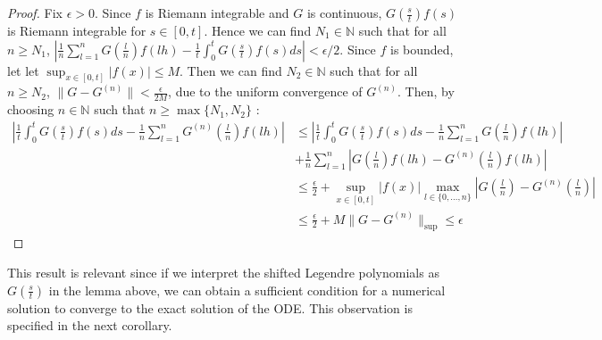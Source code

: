 \documentclass{article}
\theoremstyle{definition}
\newcommand{\pr}[1]{ \left( #1 \right) }
\begin{document}
\begin{proof}
    Fix $\epsilon > 0$. Since $f$ is Riemann integrable and $G$ is continuous, $G\pr{\frac{s}{t}}f(s)$ is Riemann integrable for $s \in [0,t]$. Hence we can find $N_1 \in \mathbb{N}$ such that for all $n \geq N_1$, $\left| \frac{1}{n} \sum_{l=1}^n G \pr{\frac{l}{n}}f\pr{lh} - \frac{1}{t}\int_0^t G \pr{\frac{s}{t}}f\pr{s} ds \right| < \epsilon / 2$. Since $f$ is bounded, let let $\sup_{x \in [0,t]} |f(x)| \leq M$. Then we can find $N_2 \in \mathbb{N}$ such that for all $n \geq N_2$, $\|G - G^{(n)}\| < \frac{\epsilon}{2M}$, due to the uniform convergence of $G^{(n)}$. Then, by choosing $n \in \mathbb{N}$ such that $n \geq \max\{N_1,N_2\}$ :
    \begin{align*}
        \left| \frac{1}{t}\int_0^t G \pr{\frac{s}{t} }f(s)ds - \frac{1}{n}\sum_{l=1}^n G^{(n)} \pr{\frac{l}{n}} f \pr{lh} \right| 
        &\leq \left| \frac{1}{t}\int_0^t G \pr{\frac{s}{t}} f(s)ds - \frac{1}{n} \sum_{l=1}^n G \pr{\frac{l}{n}}f\pr{lh} \right| \\
        &+ \frac{1}{n} \sum_{l=1}^n \left| G \pr{\frac{l}{n}}f\pr{lh} - G^{(n)} \pr{\frac{l}{n}} f\pr{lh} \right| \\
        &\leq \frac{\epsilon}{2} + \sup_{x \in [0,t]} \left| f(x) \right| \max_{l \in \{0, \dots, n\}} \left| G\pr{\frac{l}{n}} - G^{(n)} \pr{\frac{l}{n}} \right| \\
        &\leq \frac{\epsilon}{2} + M \| G - G^{(n)} \|_{\sup} \leq \epsilon
    \end{align*}
\end{proof}

This result is relevant since if we interpret the shifted Legendre polynomials as $G\pr{\frac{s}{t}}$ in the lemma above, we can obtain a sufficient condition for a numerical solution to converge to the exact solution of the ODE. This observation is specified in the next corollary.
\end{document}
